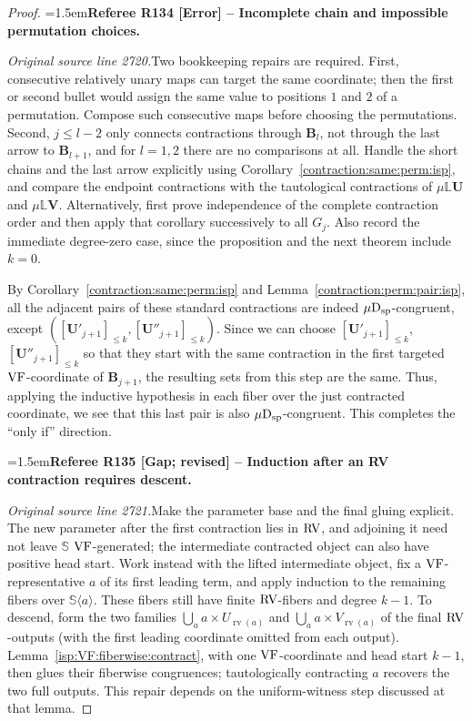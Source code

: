 \documentclass[12pt]{amsart}
\newcommand{\RefereeRemark}[4]{%
  \par\medskip\begingroup\normalfont\small\color{RefereePurple}%
  \emergencystretch=1.5em\noindent\textbf{Referee R#1 [#2] -- #3.}\par\nobreak\noindent #4\par
  \endgroup\medskip
}
\theoremstyle{plain}
\theoremstyle{definition}
\theoremstyle{remark}
\numberwithin{equation}{section}
\theoremstyle{plain}
\newcommand{\VF}{\textup{VF}}
\newcommand{\RV}{\textup{RV}}
\newcommand{\0}{\emptyset}
\newcommand{\bb}[1]{\mathbb{#1}}
\newcommand{\dsp}{\textup{D}_{\textup{sp}}}
\newcommand{\mispdb}{\mu \dsp}
\newcommand{\mL}{{\mu}{\bb L}}
\DeclareMathOperator{\rv}{rv}
\begin{document}
\begin{proof}
\RefereeRemark{134}{Error}{Incomplete chain and impossible permutation choices}{%
\textit{Original source line 2720.}\quad Two bookkeeping repairs are required. First, consecutive relatively unary maps can target the same coordinate; then the first or second bullet would assign the same value to positions $1$ and $2$ of a permutation. Compose such consecutive maps before choosing the permutations. Second, $j\leq l-2$ only connects contractions through $\bm B_l$, not through the last arrow to $\bm B_{l+1}$, and for $l=1,2$ there are no comparisons at all. Handle the short chains and the last arrow explicitly using Corollary~\ref{contraction:same:perm:isp}, and compare the endpoint contractions with the tautological contractions of $\mL\bm U$ and $\mL\bm V$. Alternatively, first prove independence of the complete contraction order and then apply that corollary successively to all $G_j$. Also record the immediate degree-zero case, since the proposition and the next theorem include $k=0$.
}
By Corollary~\ref{contraction:same:perm:isp} and Lemma~\ref{contraction:perm:pair:isp}, all the adjacent pairs of these standard contractions are indeed $\mispdb$-congruent, except $([\bm U'_{j+1}]_{\leq k}, [\bm U''_{j+1}]_{\leq k})$.  Since we can choose $[\bm U'_{j+1}]_{\leq k}$, $[\bm U''_{j+1}]_{\leq k}$ so that they start with the same contraction in the first targeted $\VF$-coordinate of $\bm B_{j+1}$, the resulting sets from this step are the same. Thus, applying  the inductive hypothesis in each fiber over the just contracted coordinate, we see that this last pair is also $\mispdb$-congruent. This completes the ``only if'' direction.

\RefereeRemark{135}{Gap; revised}{Induction after an RV contraction requires descent}{%
\textit{Original source line 2721.}\quad Make the parameter base and the final gluing explicit. The new parameter after the first contraction lies in $\RV$, and adjoining it need not leave $\mathbb S$ $\VF$-generated; the intermediate contracted object can also have positive head start. Work instead with the lifted intermediate object, fix a $\VF$-representative $a$ of its first leading term, and apply induction to the remaining fibers over $\mathbb S\langle a\rangle$. These fibers still have finite $\RV$-fibers and degree $k-1$. To descend, form the two families $\bigcup_a a\times U_{\rv(a)}$ and $\bigcup_a a\times V_{\rv(a)}$ of the final $\RV$-outputs (with the first leading coordinate omitted from each output). Lemma~\ref{isp:VF:fiberwise:contract}, with one $\VF$-coordinate and head start $k-1$, then glues their fiberwise congruences; tautologically contracting $a$ recovers the two full outputs. This repair depends on the uniform-witness step discussed at that lemma.
}
\end{proof}
\end{document}
